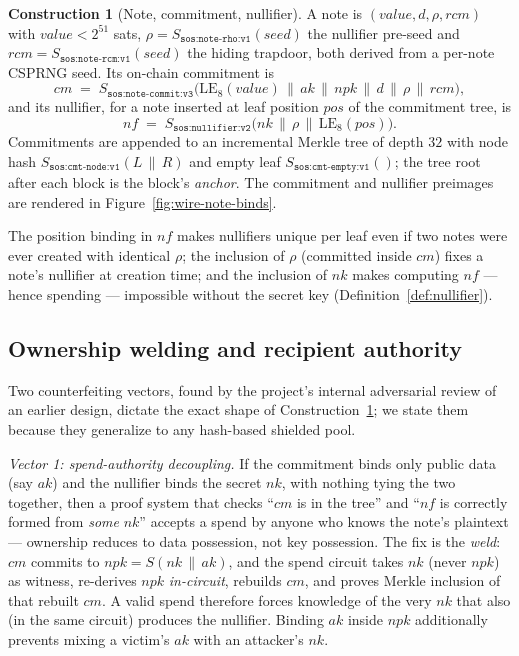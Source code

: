 \documentclass[11pt]{article}
\newcommand{\code}[1]{\texttt{#1}}
\newcommand{\LE}[1]{\mathrm{LE}_{#1}}
\newcommand{\concat}{\,\|\,}
\theoremstyle{plain}
\theoremstyle{definition}
\newtheorem{construction}[theorem]{Construction}
\theoremstyle{remark}
\begin{document}
\begin{construction}[Note, commitment, nullifier]
\label{con:note}
A note is $(\mathit{value}, d, \rho, \mathit{rcm})$ with
$\mathit{value} < 2^{51}$ sats, $\rho = S_{\code{sos:note-rho:v1}}(\mathit{seed})$
the nullifier pre-seed and $\mathit{rcm} = S_{\code{sos:note-rcm:v1}}(\mathit{seed})$
the hiding trapdoor, both derived from a per-note CSPRNG seed. Its on-chain
commitment is
\[
\mathit{cm} \;=\; S_{\code{sos:note-commit:v3}}\big(
\LE{8}(\mathit{value}) \concat \mathit{ak} \concat \mathit{npk} \concat d
\concat \rho \concat \mathit{rcm}\big),
\]
and its nullifier, for a note inserted at leaf position $\mathit{pos}$ of the
commitment tree, is
\[
\mathit{nf} \;=\; S_{\code{sos:nullifier:v2}}\big(\mathit{nk} \concat \rho
\concat \LE{8}(\mathit{pos})\big).
\]
Commitments are appended to an incremental Merkle tree of depth $32$ with
node hash $S_{\code{sos:cmt-node:v1}}(L \concat R)$ and empty leaf
$S_{\code{sos:cmt-empty:v1}}()$; the tree root after each block is the
block's \emph{anchor}. The commitment and nullifier preimages are rendered
in Figure~\ref{fig:wire-note-binds}.
\end{construction}

The position binding in $\mathit{nf}$ makes nullifiers unique per leaf even
if two notes were ever created with identical $\rho$; the inclusion of
$\rho$ (committed inside $\mathit{cm}$) fixes a note's nullifier at creation
time; and the inclusion of $\mathit{nk}$ makes computing $\mathit{nf}$ ---
hence spending --- impossible without the secret key
(Definition~\ref{def:nullifier}).

\subsection{Ownership welding and recipient authority}
\label{sec:ownership}

Two counterfeiting vectors, found by the project's internal adversarial
review of an earlier design, dictate the exact shape of
Construction~\ref{con:note}; we state them because they generalize to any
hash-based shielded pool.

\emph{Vector 1: spend-authority decoupling.} If the commitment binds only
public data (say $\mathit{ak}$) and the nullifier binds the secret
$\mathit{nk}$, with nothing tying the two together, then a proof system that
checks ``$\mathit{cm}$ is in the tree'' and ``$\mathit{nf}$ is correctly
formed from \emph{some} $\mathit{nk}$'' accepts a spend by anyone who knows
the note's plaintext --- ownership reduces to data possession, not key
possession. The fix is the \emph{weld}: $\mathit{cm}$ commits to
$\mathit{npk} = S(\mathit{nk} \concat \mathit{ak})$, and the spend circuit
takes $\mathit{nk}$ (never $\mathit{npk}$) as witness, re-derives
$\mathit{npk}$ \emph{in-circuit}, rebuilds $\mathit{cm}$, and proves Merkle
inclusion of that rebuilt $\mathit{cm}$. A valid spend therefore forces
knowledge of the very $\mathit{nk}$ that also (in the same circuit) produces
the nullifier. Binding $\mathit{ak}$ inside $\mathit{npk}$ additionally
prevents mixing a victim's $\mathit{ak}$ with an attacker's $\mathit{nk}$.
\end{document}
